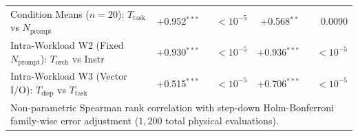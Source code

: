\begin{table}[t]
\begin{tabular}{l r r r r}
Condition Means ($n=20$): $T_{\text{task}}$ vs $N_{\text{prompt}}$ & +0.952$^{***}$ & $< 10^{-5}$ & +0.568$^{**}$ & 0.0090 \\
Intra-Workload W2 (Fixed $N_{\text{prompt}}$): $T_{\text{orch}}$ vs Instr & +0.930$^{***}$ & $< 10^{-5}$ & +0.936$^{***}$ & $< 10^{-5}$ \\
Intra-Workload W3 (Vector I/O): $T_{\text{disp}}$ vs $T_{\text{task}}$ & +0.515$^{***}$ & $< 10^{-5}$ & +0.706$^{***}$ & $< 10^{-5}$ \\
\hline
\multicolumn{5}{l}{\footnotesize Non-parametric Spearman rank correlation with step-down Holm-Bonferroni family-wise error adjustment ($1{,}200$ total physical evaluations).} \\
\hline
\end{tabular}
\end{table}
